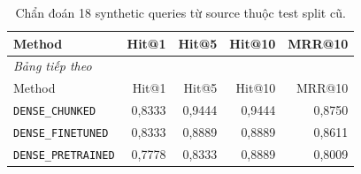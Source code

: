 \begingroup\small\setlength{\tabcolsep}{4pt}\renewcommand{\arraystretch}{1.16}
\begin{longtable}{p{.37\linewidth}rrrr}
\caption{Chẩn đoán 18 synthetic queries từ source thuộc test split cũ.}\label{tab:synthetic-test}\\
\toprule Method & Hit@1 & Hit@5 & Hit@10 & MRR@10 \\
\midrule\endfirsthead
\multicolumn{5}{l}{\textit{Bảng tiếp theo}}\\
\toprule Method & Hit@1 & Hit@5 & Hit@10 & MRR@10 \\
\midrule\endhead
\bottomrule\endfoot
{\footnotesize\texttt{DENSE\_CHUNKED}} & 0,8333 & 0,9444 & 0,9444 & 0,8750 \\
{\footnotesize\texttt{DENSE\_FINETUNED}} & 0,8333 & 0,8889 & 0,8889 & 0,8611 \\
{\footnotesize\texttt{DENSE\_PRETRAINED}} & 0,7778 & 0,8333 & 0,8889 & 0,8009 \\
\end{longtable}\endgroup
{}
